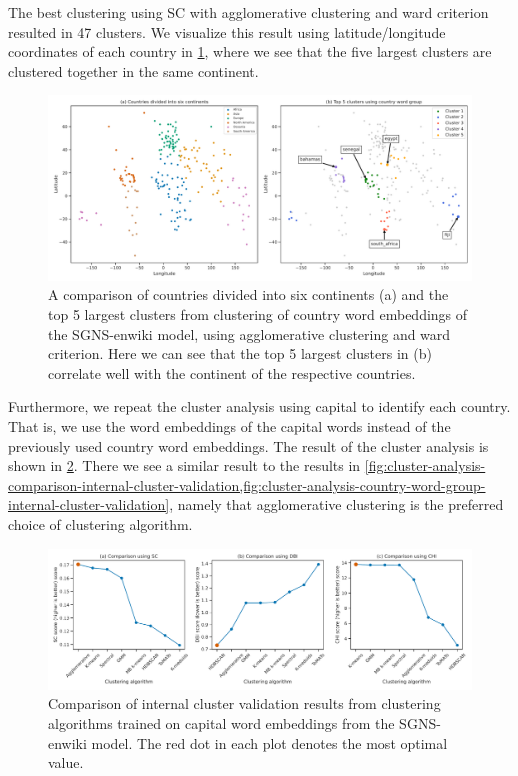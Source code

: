The best clustering using SC with agglomerative clustering and ward criterion resulted in 47 clusters. We visualize this result using latitude/longitude coordinates of each country in \cref{fig:cluster-analysis-agglomerative-country-word-group-top-clusters},  where we see that the five largest clusters are clustered together in the same continent.
\begin{figure}[H]
    \centering
    \includegraphics[width=\textwidth]{thesis/figures/cluster-analysis-agglomerative-country-word-group-top-clusters.pdf}
    \caption{A comparison of countries divided into six continents (a) and the top 5 largest clusters from clustering of country word embeddings of the SGNS-enwiki model, using agglomerative clustering and ward criterion. Here we can see that the top 5 largest clusters in (b) correlate well with the continent of the respective countries.}
    \label{fig:cluster-analysis-agglomerative-country-word-group-top-clusters}
\end{figure}

Furthermore, we repeat the cluster analysis using capital to identify each country. That is, we use the word embeddings of the capital words instead of the previously used country word embeddings. The result of the cluster analysis is shown in \cref{fig:cluster-analysis-country-capitals-word-group-internal-cluster-validation}. There we see a similar result to the results in \cref{fig:cluster-analysis-comparison-internal-cluster-validation,fig:cluster-analysis-country-word-group-internal-cluster-validation}, namely that agglomerative clustering is the preferred choice of clustering algorithm.
\begin{figure}[H]
    \centering
    \includegraphics[width=\textwidth]{thesis/figures/cluster-analysis-country-capitals-word-group-internal-cluster-validation.pdf}
    \caption{Comparison of internal cluster validation results from clustering algorithms trained on capital word embeddings from the SGNS-enwiki model. The red dot in each plot denotes the most optimal value.}
    \label{fig:cluster-analysis-country-capitals-word-group-internal-cluster-validation}
\end{figure}


